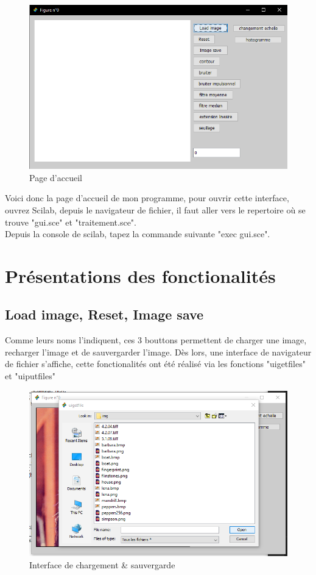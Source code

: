 \documentclass[12pt, letterpaper]{article}
\begin{document}
\begin{figure}[h!]
    \includegraphics[width=\linewidth]{img/fig1.png}
    \caption{Page d'accueil}
    \label{fig:accueil}
\end{figure}

Voici donc la page d'accueil de mon programme, pour ouvrir cette interface, ouvrez Scilab, depuis le navigateur de fichier, 
il faut aller vers le repertoire où se trouve "gui.sce" et "traitement.sce".\\
Depuis la console de scilab, tapez la commande suivante "exec gui.sce".

\section{Présentations des fonctionalités}
\subsection{Load image, Reset, Image save}
Comme leurs noms l'indiquent, ces 3 bouttons permettent de charger une image, recharger l'image et de sauvergarder l'image.
Dès lors, une interface de navigateur de fichier s'affiche, cette fonctionalités ont été réalisé via les fonctions "uigetfiles" et "uiputfiles"
\begin{figure}[h!]
    \includegraphics[width=\linewidth]{img/fig2.png}
    \caption{Interface de chargement \& sauvergarde }
    \label{fig:loading}
\end{figure}
 
\end{document}
